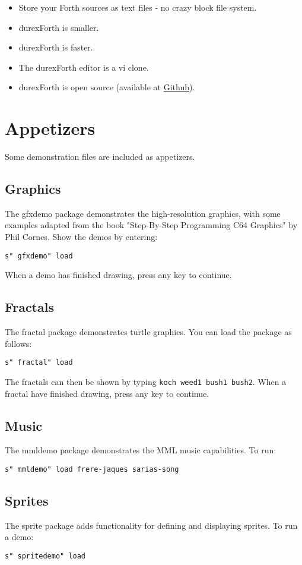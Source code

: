 \begin{itemize}
\item Store your Forth sources as text files - no crazy block file system.
\item durexForth is smaller.
\item durexForth is faster.
\item The durexForth editor is a vi clone.
\item durexForth is open source (available at \href{https://github.com/jkotlinski/durexforth}{Github}).
\end{itemize}

\section{Appetizers}

Some demonstration files are included as appetizers.

\subsection{Graphics}

The gfxdemo package demonstrates the high-resolution graphics, with some examples adapted from the book "Step-By-Step Programming C64 Graphics" by Phil Cornes. 
Show the demos by entering:

\texttt{s" gfxdemo" load}

When a demo has finished drawing, press any key to continue.

\subsection{Fractals}

The fractal package demonstrates turtle graphics. You can load the package as follows:

\texttt{s" fractal" load}

The fractals can then be shown by typing \texttt{koch weed1 bush1 bush2}. When a fractal have finished drawing, press any key to continue.

\subsection{Music}

The mmldemo package demonstrates the MML music capabilities. To run:

\texttt{s" mmldemo" load frere-jaques sarias-song}

\subsection{Sprites}

The sprite package adds functionality for defining and displaying sprites. To run a demo:

\texttt{s" spritedemo" load}
